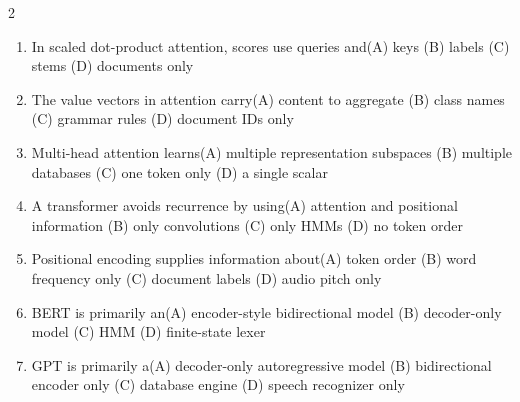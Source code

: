 \documentclass[a4paper]{article}
\begin{document}
\begin{multicols*}{2}
\begin{enumerate}[resume]
\item In scaled dot-product attention, scores use queries and\newline\hspace*{0.6em}(A) keys \quad (B) labels \newline\hspace*{0.6em}(C) stems \quad (D) documents only
\item The value vectors in attention carry\newline\hspace*{0.6em}(A) content to aggregate \quad (B) class names \newline\hspace*{0.6em}(C) grammar rules \quad (D) document IDs only
\item Multi-head attention learns\newline\hspace*{0.6em}(A) multiple representation subspaces \quad (B) multiple databases \newline\hspace*{0.6em}(C) one token only \quad (D) a single scalar
\item A transformer avoids recurrence by using\newline\hspace*{0.6em}(A) attention and positional information \quad (B) only convolutions \newline\hspace*{0.6em}(C) only HMMs \quad (D) no token order
\item Positional encoding supplies information about\newline\hspace*{0.6em}(A) token order \quad (B) word frequency only \newline\hspace*{0.6em}(C) document labels \quad (D) audio pitch only
\item BERT is primarily an\newline\hspace*{0.6em}(A) encoder-style bidirectional model \quad (B) decoder-only model \newline\hspace*{0.6em}(C) HMM \quad (D) finite-state lexer
\item GPT is primarily a\newline\hspace*{0.6em}(A) decoder-only autoregressive model \quad (B) bidirectional encoder only \newline\hspace*{0.6em}(C) database engine \quad (D) speech recognizer only

\end{enumerate}
\end{multicols*}
\end{document}
